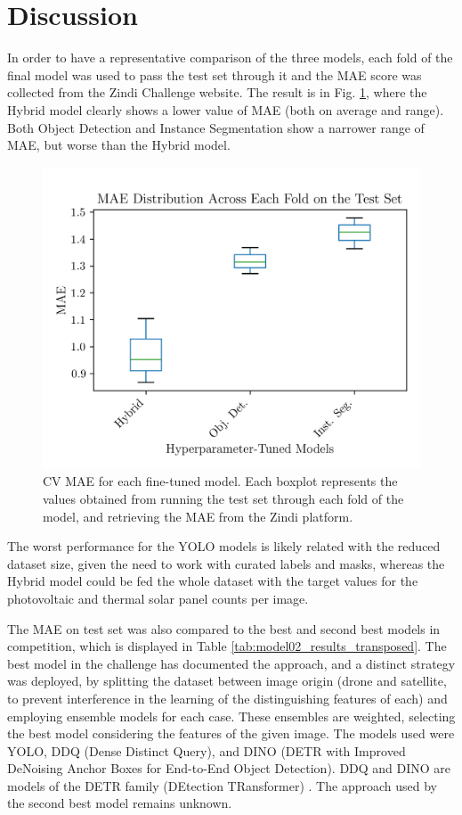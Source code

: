 \documentclass[conference]{IEEEtran}
\begin{document}
\section{Discussion}

In order to have a representative comparison of the three models, each fold of the final model was used to pass the test set through it and the MAE score was collected from the Zindi Challenge website. The result is in Fig. \ref{fig:results_mae_boxplot}, where the Hybrid model clearly shows a lower value of MAE (both on average and range). Both Object Detection and Instance Segmentation show a narrower range of MAE, but worse than the Hybrid model.
\begin{figure}[H]
    \centering
    \includegraphics[width=1\linewidth]{assets/results_mae_boxplot.png}
    \caption{CV MAE for each fine-tuned model. Each boxplot represents the values obtained from running the test set through each fold of the model, and retrieving the MAE from the Zindi platform.}
    \label{fig:results_mae_boxplot}
\end{figure}

The worst performance for the YOLO models is likely related with the reduced dataset size, given the need to work with curated labels and masks, whereas the Hybrid model could be fed the whole dataset with the target values for the photovoltaic and thermal solar panel counts per image.

The MAE on test set was also compared to the best and second best models in competition, which is displayed in Table \ref{tab:model02_results_transposed}. The best model in the challenge has documented the approach, and a distinct strategy was deployed, by splitting the dataset between image origin (drone and satellite, to prevent interference in the learning of the distinguishing features of each) and employing ensemble models for each case. These ensembles are weighted, selecting the best model considering the features of the given image. The models used were YOLO, DDQ (Dense Distinct Query), and DINO (DETR with Improved DeNoising Anchor Boxes for End-to-End Object Detection). DDQ and DINO are models of the DETR family (DEtection TRansformer) \cite{zindi_lacuna_solar_survey}. The approach used by the second best model remains unknown.
\end{document}
